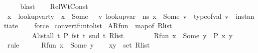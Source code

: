 \begin{isabellebody}
\ \ \ \isamarkupfalse%
\ blast\isanewline
\ \ \isamarkupfalse%
\ RelWtConst\isanewline
\ \ \isamarkupfalse%
\ {\isacartoucheopen}{\isasymAnd}x\ {\isasymtau}{\isachardot}{\kern0pt}\ lookup{\isacharunderscore}{\kern0pt}var{\isacharunderscore}{\kern0pt}ty\ {\isasymLambda}\ x\ {\isacharequal}{\kern0pt}\ Some\ {\isasymtau}\ {\isasymLongrightarrow}\ {\isasymexists}v{\isachardot}{\kern0pt}\ lookup{\isacharunderscore}{\kern0pt}var\ {\isasymLambda}\ ns\ x\ {\isacharequal}{\kern0pt}\ Some\ v\ {\isasymand}\ type{\isacharunderscore}{\kern0pt}of{\isacharunderscore}{\kern0pt}val\ v\ {\isacharequal}{\kern0pt}\ instantiate\ {\isasymOmega}\ {\isasymtau}{\isacartoucheclose}\ \isamarkupfalse%
\ force%
\endisatagproof
{\isafoldproof}%
%
\isadelimproof
\isanewline
%
\endisadelimproof
\isanewline
{}\isamarkupfalse%
\ convert{\isacharunderscore}{\kern0pt}fun{\isacharunderscore}{\kern0pt}to{\isacharunderscore}{\kern0pt}list{\isacharcolon}{\kern0pt}\isanewline
{}\ A{}{\isacharcolon}{\kern0pt}{\isachardoublequoteopen}R{\isacharunderscore}{\kern0pt}fun\ {\isacharequal}{\kern0pt}\ map{\isacharunderscore}{\kern0pt}of\ R{\isacharunderscore}{\kern0pt}list{\isachardoublequoteclose}\ \isanewline
\ \ \ \ \ \ \ \ A{}{\isacharcolon}{\kern0pt}{\isachardoublequoteopen}list{\isacharunderscore}{\kern0pt}all\ {\isacharparenleft}{\kern0pt}{\isasymlambda}t{\isachardot}{\kern0pt}\ P\ {\isacharparenleft}{\kern0pt}fst\ t{\isacharparenright}{\kern0pt}\ {\isacharparenleft}{\kern0pt}snd\ t{\isacharparenright}{\kern0pt}{\isacharparenright}{\kern0pt}\ R{\isacharunderscore}{\kern0pt}list{\isachardoublequoteclose}\isanewline
\ \ \ \ \ \ \ \ {\isachardoublequoteopen}R{\isacharunderscore}{\kern0pt}fun\ x\ {\isacharequal}{\kern0pt}\ Some\ y\ {\isasymlongrightarrow}\ P\ x\ y{\isachardoublequoteclose}\ \ \ \ \isanewline
%
\isadelimproof
%
\endisadelimproof
%
\isatagproof
{}\isamarkupfalse%
\ {\isacharparenleft}{\kern0pt}rule{\isacharplus}{\kern0pt}{\isacharparenright}{\kern0pt}\ \ \isanewline
\ \ \isamarkupfalse%
\ {\isachardoublequoteopen}R{\isacharunderscore}{\kern0pt}fun\ x\ {\isacharequal}{\kern0pt}\ Some\ y{\isachardoublequoteclose}\isanewline
\ \ \isamarkupfalse%
\ {\isachardoublequoteopen}{\isacharparenleft}{\kern0pt}x{\isacharcomma}{\kern0pt}y{\isacharparenright}{\kern0pt}\ {\isasymin}\ set\ {\isacharparenleft}{\kern0pt}R{\isacharunderscore}{\kern0pt}list{\isacharparenright}{\kern0pt}{\isachardoublequoteclose}\isanewline

\end{isabellebody}
